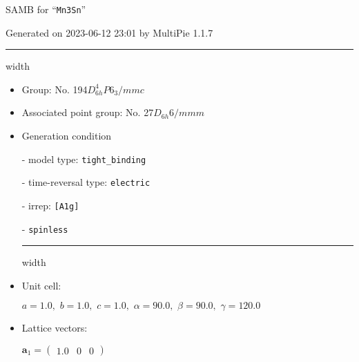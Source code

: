 \documentclass[fleqn,10pt,landscape]{article}
\begin{document}
\setcounter{MaxMatrixCols}{16}

\setlength{\baselineskip}{16pt}
\footnotesize
\begin{center}
\LARGE
SAMB for ``\texttt{Mn3Sn}''
\end{center}
\begin{flushright}
Generated on 2023-06-12 23:01 by MultiPie 1.1.7
\end{flushright}
\vspace{1cm}


 \hfil \hrule height 1mm width \textwidth \hfil

\begin{itemize}
\item Group: No. 194\quad$D_{6h}^{4}$\quad$P6_3/mmc$\quad[ hexagonal ]

\item Associated point group: No. 27\quad$D_{6h}$\quad$6/mmm$\quad[ hexagonal ]

\vspace{5mm}

\item Generation condition

\quad - model type: \texttt{tight_binding}

\quad - time-reversal type: \texttt{electric}

\quad - irrep: \texttt{[A1g]}

\quad - \texttt{spinless}


 \hfil \hrule height 1mm width \textwidth \hfil

\item Unit cell:

\quad $a=1.0,\,\, b=1.0,\,\, c=1.0,\,\, \alpha=90.0,\,\, \beta=90.0,\,\, \gamma=120.0$

\item Lattice vectors:

\quad $\bm{a}_1=\begin{pmatrix} 1.0 & 0 & 0 \end{pmatrix}$


\end{itemize}
\end{document}
